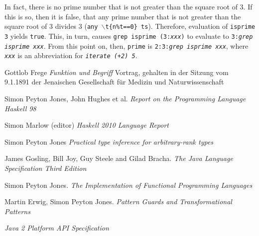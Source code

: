 \documentclass[a4paper,landscape,twocolumn]{report}
\begin{document}
In fact, there is no prime number that is not greater than the
square root of 3.
If this is so, then it is false, that any prime number that is not
greater than the square root of 3 divides 3 ({\tt any
$\backslash$t\{n\%t==0\} ts}).
Therefore, evaluation of {\tt isprime 3} yields {\tt true}.
This, in turn, causes {\tt grep isprime (3:{\it xxx})} to evaluate
to
{\tt 3:{\it grep isprime xxx}}.
From this point on, then, {\tt prime} is
{\tt 2:3:{\it grep isprime xxx}}, where {\tt\it xxx} is an abbreviation
for {\tt\it iterate (+2) 5}.



\begin{thebibliography}{99}

 Gottlob Frege \emph{Funktion und Begriff} 
\small{Vortrag, gehalten in der Sitzung vom 9.1.1891 der Jenaischen Gesellschaft für Medizin und Naturwissenschaft}

 Simon Peyton Jones,
John Hughes et al. \emph{Report on the Programming Language
Haskell 98}

 Simon Marlow (editor) \emph{Haskell 2010 Language Report}

 Simon Peyton Jones \emph{Practical type
inference for arbitrary-rank types}

 James Gosling, Bill Joy, Guy Steele and
Gilad Bracha. \emph{The Java Language Specification Third
Edition}

 Simon Peyton Jones. \emph{The Implementation of
Functional Programming Languages}

 Martin Erwig, Simon Peyton Jones. \emph{Pattern
Guards and Transformational Patterns}

 \emph{Java 2 Platform API Specification}

\end{thebibliography}


\printindex

\end{document}
